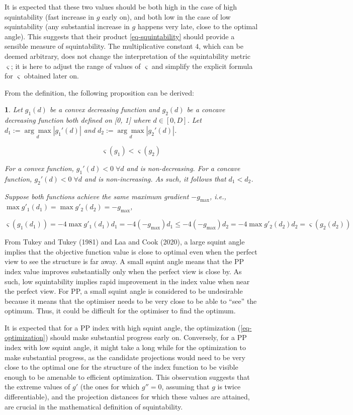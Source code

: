 \documentclass[
  12pt,
]{interact}
\theoremstyle{plain}
\newtheorem{prop}{\protect\propositionname}
\providecommand{\propositionname}{Proposition}
\begin{document}
It is expected that these two values should be both high in the case of
high squintability (fast increase in \(g\) early on), and both low in
the case of low squintability (any substantial increase in \(g\) happens
very late, close to the optimal angle). This suggests that their product
\eqref{eq-squintability} should provide a sensible measure of
squintability. The multiplicative constant \(4\), which can be deemed
arbitrary, does not change the interpretation of the squintability
metric \(\varsigma\); it is here to adjust the range of values of
\(\varsigma\) and simplify the explicit formula for \(\varsigma\)
obtained later on.

From the definition, the following proposition can be derived:

\begin{prop}\label{prop:convex-concave}
Let $g_1(d)$ be a convex decreasing function and $g_2(d)$ be a concave decreasing function both defined on [0, 1] where $d \in [0, D]$. Let $d_1 := \underset{d}{\arg \max} |g_1'(d)|$ and $d_2 := \underset{d}{\arg \max} |g_2'(d)|$.

$$\varsigma(g_1) < \varsigma(g_2)$$

For a convex function, $g_1'(d) < 0 \; \forall d$ and is non-decreasing. For a concave function, $g_2'(d) < 0 \; \forall d$ and is non-increasing. As such, it follows that $d_1 < d_2$.

Suppose both functions achieve the same maximum gradient $-g_{\max}$, i.e., $\max g'_1(d_1) = \max g'_2(d_2) = -g_{\max}$,

$$
\varsigma(g_1(d_1)) = -4  \max g'_1(d_1)  d_1 = -4  (-g_{\max}) d_1 \leq -4  (-g_{\max}) d_2 = -4 \max g'_2(d_2)  d_2 = \varsigma(g_2(d_2))
$$

\end{prop}

From Tukey and Tukey (1981) and Laa and Cook (2020), a large squint
angle implies that the objective function value is close to optimal even
when the perfect view to see the structure is far away. A small squint
angle means that the PP index value improves substantially only when the
perfect view is close by. As such, low squintability implies rapid
improvement in the index value when near the perfect view. For PP, a
small squint angle is considered to be undesirable because it means that
the optimiser needs to be very close to be able to ``see'' the optimum.
Thus, it could be difficult for the optimiser to find the optimum.

It is expected that for a PP index with high squint angle, the
optimization (\ref{eq-optimization}) should make substantial progress
early on. Conversely, for a PP index with low squint angle, it might
take a long while for the optimization to make substantial progress, as
the candidate projections would need to be very close to the optimal one
for the structure of the index function to be visible enough to be
amenable to efficient optimization. This observation suggests that the
extreme values of \(g'\) (the ones for which \(g''=0\), assuming that
\(g\) is twice differentiable), and the projection distances for which
these values are attained, are crucial in the mathematical definition of
squintability.
\end{document}
